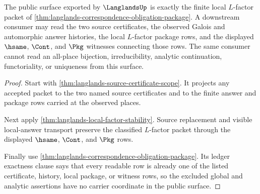\begin{theorem}
\label{thm:langlands-finite-local-factor-public-surface}
The public surface exported by $\LanglandsUp$ is exactly the finite local
$L$-factor packet of \autoref{thm:langlands-correspondence-obligation-package}.
A downstream consumer may read the two source certificates, the observed
Galois and automorphic answer histories, the local $L$-factor package rows,
and the displayed $\hsame$, $\Cont$, and $\Pkg$ witnesses connecting those
rows. The same consumer cannot read an all-place bijection, irreducibility,
analytic continuation, functoriality, or uniqueness from this surface.
\end{theorem}
\begin{proof}
Start with \autoref{thm:langlands-source-certificate-scope}. It projects any
accepted packet to the two named source certificates and to the finite answer
and package rows carried at the observed places.

Next apply \autoref{thm:langlands-local-factor-stability}. Source
replacement and visible local-answer transport preserve the classified
$L$-factor packet through the displayed $\hsame$, $\Cont$, and $\Pkg$ rows.

Finally use \autoref{thm:langlands-correspondence-obligation-package}. Its
ledger exactness clause says that every readable row is already one of the
listed certificate, history, local package, or witness rows, so the excluded
global and analytic assertions have no carrier coordinate in the public
surface.
\end{proof}

